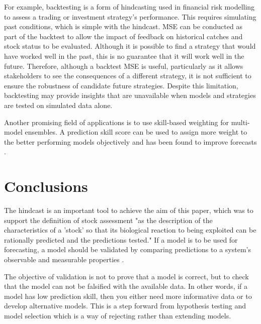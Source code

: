 \documentclass[11pt,a4paper]{article}
\begin{document}
{For example, backtesting is a form of hindcasting used in financial risk modelling to assess a trading or investment strategy's performance. This requires simulating past conditions, which is simple with the hindcast. MSE can be conducted as part of the backtest to allow the impact of feedback on historical catches and stock status to be evaluated. Although it is possible to find a strategy that would have worked well in the past, this is no guarantee that it will work well in the future. Therefore, although a backtest MSE is useful, particularly as it allows stakeholders to see the consequences of a different strategy, it is not sufficient to ensure the robustness of candidate future strategies. Despite this limitation, backtesting may provide insights that are unavailable when models and strategies are tested on simulated data alone.

Another promising field of applications is to use skill-based weighting for multi-model ensembles. A prediction skill score can be used to assign more weight to the better performing models objectively and has been found to improve forecasts \citep[e.g.][]{casanova2009weighting}. %

\section{Conclusions}

The hindcast is an important tool to achieve the aim of this paper, which was to support the definition of stock assessment "as the description of the characteristics of a ’stock’ so that its biological reaction to being exploited can be rationally predicted and the predictions tested." If a model is to be used for forecasting, a model should be validated by comparing predictions to a system's observable and measurable properties \citep{ianelli2016multi}. 

The objective of validation is not to prove that a model is correct, but to check that the model can not be falsified with the available data. In other words, if a model has low prediction skill, then you either need more informative data or to develop alternative models. This is a step forward from hypothesis testing and model selection which is a way of rejecting rather than extending models. 

}
\end{document}
